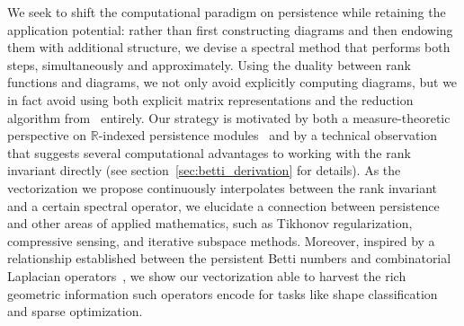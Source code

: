 \documentclass[10pt]{article}
\numberwithin{equation}{section}
\newcommand{\+}{%
	\raisebox{0.18ex}{\scaleobj{0.55}{+}}
}
\theoremstyle{definition}
\theoremstyle{definition}
\begin{document}
We seek to shift the computational paradigm on persistence while retaining the application potential: rather than first constructing diagrams and then endowing them with additional structure, we devise a spectral method that performs both steps, simultaneously and approximately. 
Using the duality between rank functions and diagrams, we not only avoid explicitly computing diagrams, but we in fact avoid using both explicit matrix representations and the reduction algorithm from~\cite{edelsbrunner2022computational} entirely.  
Our strategy is motivated by both a measure-theoretic perspective on $\mathbb{R}$-indexed persistence modules~\cite{chazal2016structure} and by a technical observation that suggests several computational advantages to working with the rank invariant directly (see section~\ref{sec:betti_derivation} for details). 
As the vectorization we propose continuously interpolates between the rank invariant and a certain spectral operator, we elucidate a connection between persistence and other areas of applied mathematics, such as Tikhonov regularization, compressive sensing, and iterative subspace  methods.
Moreover, inspired by a relationship established between the persistent Betti numbers and combinatorial Laplacian operators~\cite{}, we show our vectorization able to harvest the rich geometric information such operators encode for tasks like shape classification and sparse optimization.  


\end{document}
